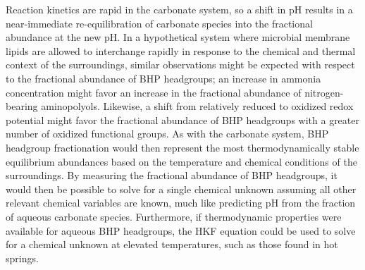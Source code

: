 Reaction kinetics are rapid in the carbonate system, so a shift in pH results in a near-immediate re-equilibration of carbonate species into the fractional abundance at the new pH. In a hypothetical system where microbial membrane lipids are allowed to interchange rapidly in response to the chemical and thermal context of the surroundings, similar observations might be expected with respect to the fractional abundance of BHP headgroups; an increase in ammonia concentration might favor an increase in the fractional abundance of nitrogen-bearing aminopolyols. Likewise, a shift from relatively reduced to oxidized redox potential might favor the fractional abundance of BHP headgroups with a greater number of oxidized functional groups. As with the carbonate system, BHP headgroup fractionation would then represent the most thermodynamically stable equilibrium abundances based on the temperature and chemical conditions of the surroundings. By measuring the fractional abundance of BHP headgroups, it would then be possible to solve for a single chemical unknown assuming all other relevant chemical variables are known, much like predicting pH from the fraction of aqueous carbonate species. Furthermore, if thermodynamic properties were available for aqueous BHP headgroups, the HKF equation could be used to solve for a chemical unknown at elevated temperatures, such as those found in hot springs.

